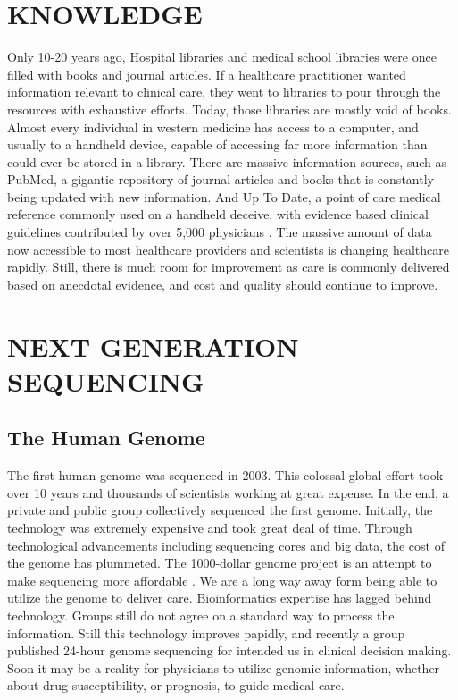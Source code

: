 \documentclass[sigconf]{acmart}
\begin{document}
\section{KNOWLEDGE}

Only 10-20 years ago, Hospital libraries and medical school libraries were once filled with books and journal articles.  If a healthcare practitioner wanted information relevant to clinical care, they went to libraries to pour through the resources with exhaustive efforts.   Today, those libraries are mostly void of books.  Almost every individual in western medicine has access to a computer, and usually to a handheld device, capable of accessing far more information than could ever be stored in a library.  There are massive information sources, such as PubMed, a gigantic repository of journal articles and books that is constantly being updated with new information.  And Up To Date, a point of care medical reference commonly used on a handheld deceive, with evidence based clinical guidelines contributed by over 5,000 physicians \cite{wiki-uptodate}. The massive amount of data now accessible to most healthcare providers and scientists is changing healthcare rapidly.  Still, there is much room for improvement as care is commonly delivered based on anecdotal evidence, and cost and quality should continue to improve.    

\section{NEXT GENERATION SEQUENCING}

\subsection{	The Human Genome}

The first human genome was sequenced in 2003\cite{collins2003human}.  This colossal global
effort took over 10 years and thousands of scientists working at great
expense.  In the end, a private and public group collectively
sequenced the first genome.  Initially, the technology was extremely
expensive and took great deal of time.  Through technological
advancements including sequencing cores and big data, the cost of the
genome has plummeted.  The 1000-dollar genome project is an attempt to
make sequencing more affordable \cite{fox6}.  We are a long way away form
being able to utilize the genome to deliver care.  Bioinformatics
expertise has lagged behind technology.  Groups still do not agree on
a standard way to process the information.  Still this technology
improves papidly, and recently a group published 24-hour genome
sequencing for intended us in clinical decision making. Soon it may be
a reality for physicians to utilize genomic information, whether about
drug susceptibility, or prognosis, to guide medical care.
\end{document}
